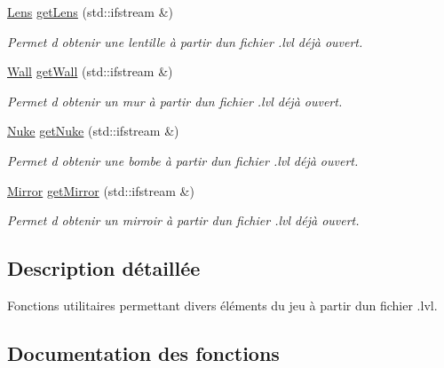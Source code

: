 \begin{DoxyCompactItemize}
\hyperlink{classLens}{Lens} \hyperlink{namespacelevelFactory_a697af6e8eba86734063c0678c1b5b926}{get\+Lens} (std\+::ifstream \&)
\begin{DoxyCompactList}\small\item\em Permet d\textquotesingle{} obtenir une lentille à partir d\textquotesingle{}un fichier .lvl déjà ouvert. \end{DoxyCompactList}\item 
\hyperlink{classWall}{Wall} \hyperlink{namespacelevelFactory_a94f4b8816d9893571a0cbd2fe55f3adf}{get\+Wall} (std\+::ifstream \&)
\begin{DoxyCompactList}\small\item\em Permet d\textquotesingle{} obtenir un mur à partir d\textquotesingle{}un fichier .lvl déjà ouvert. \end{DoxyCompactList}\item 
\hyperlink{classNuke}{Nuke} \hyperlink{namespacelevelFactory_aa187b99195fd9d9106eaf8b6ac3b6809}{get\+Nuke} (std\+::ifstream \&)
\begin{DoxyCompactList}\small\item\em Permet d\textquotesingle{} obtenir une bombe à partir d\textquotesingle{}un fichier .lvl déjà ouvert. \end{DoxyCompactList}\item 
\hyperlink{classMirror}{Mirror} \hyperlink{namespacelevelFactory_a9e17b53fc85131232092e428a2f0c803}{get\+Mirror} (std\+::ifstream \&)
\begin{DoxyCompactList}\small\item\em Permet d\textquotesingle{} obtenir un mirroir à partir d\textquotesingle{}un fichier .lvl déjà ouvert. \end{DoxyCompactList}\end{DoxyCompactItemize}


\subsection{Description détaillée}
Fonctions utilitaires permettant divers éléments du jeu à partir d\textquotesingle{}un fichier .lvl. 

\subsection{Documentation des fonctions}
\hypertarget{namespacelevelFactory_a4a9434297ea3998d9466a0f11407c041}{}
